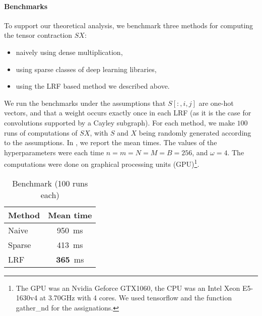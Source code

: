 \paragraph{Benchmarks}
To support our theoretical analysis, we benchmark three methods for computing the tensor contraction $SX$:
\begin{itemize}
  \item naively using dense multiplication,
  \item using sparse classes of deep learning libraries,
  \item using the LRF based method we described above.
\end{itemize}

We run the benchmarks under the assumptions that $S[:,i,j]$ are one-hot vectors, and that a weight occurs exactly once in each LRF (as it is the case for convolutions supported by a Cayley subgraph). For each method, we make $100$ runs of computations of $SX$, with $S$ and $X$ being randomly generated according to the assumptions. In , we report the mean times. The values of the hyperparameters were each time $n = m = N = M = B = 256$, and $\omega = 4$. The computations were done on graphical processing units (GPU)\footnote{The GPU was an Nvidia Geforce GTX1060, the CPU was an Intel Xeon E5-1630v4 at 3.70GHz with 4 cores. We used tensorflow and the function gather\_nd for the assignations.}.

\begin{table}[H]
  \centering
\begin{tabular}{lc}
  Method & Mean time\\
  \hline
  Naive & 950~ms\\
  Sparse & 413~ms\\
  LRF & \textbf{365}~ms
\end{tabular}
\caption{Benchmark (100 runs each)}
\label{tab:ben}
\end{table}

